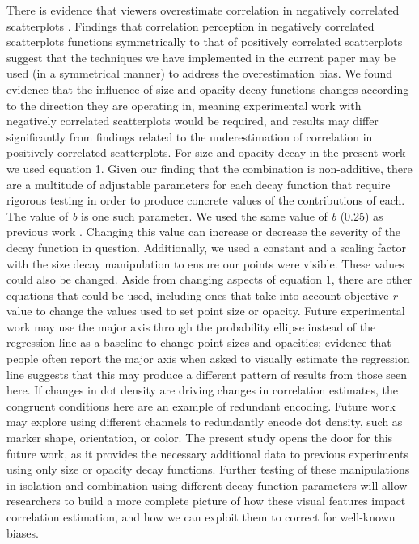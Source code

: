 \documentclass[sigconf]{acmart}
\begin{document}
There is evidence that viewers overestimate correlation in negatively
correlated scatterplots \citep{sher_2017}. Findings that correlation
perception in negatively correlated scatterplots functions symmetrically
to that of positively correlated scatterplots \citep{harrison_2014}
suggest that the techniques we have implemented in the current paper may
be used (in a symmetrical manner) to address the overestimation bias. We
found evidence that the influence of size and opacity decay functions
changes according to the direction they are operating in, meaning
experimental work with negatively correlated scatterplots would be
required, and results may differ significantly from findings related to
the underestimation of correlation in positively correlated
scatterplots. For size and opacity decay in the present work we used
equation 1. Given our finding that the combination is non-additive,
there are a multitude of adjustable parameters for each decay function
that require rigorous testing in order to produce concrete values of the
contributions of each. The value of \emph{b} is one such parameter. We
used the same value of \emph{b} (0.25) as previous work
\citep{strain_2023, strain_2023b}. Changing this value can increase or
decrease the severity of the decay function in question. Additionally,
we used a constant and a scaling factor with the size decay manipulation
to ensure our points were visible. These values could also be changed.
Aside from changing aspects of equation 1, there are other equations
that could be used, including ones that take into account objective
\emph{r} value to change the values used to set point size or opacity.
Future experimental work may use the major axis through the probability
ellipse instead of the regression line as a baseline to change point
sizes and opacities; evidence that people often report the major axis
when asked to visually estimate the regression line \citep{collyer_1990}
suggests that this may produce a different pattern of results from those
seen here. If changes in dot density are driving changes in correlation
estimates, the congruent conditions here are an example of redundant
encoding. Future work may explore using different channels to
redundantly encode dot density, such as marker shape, orientation, or
color. The present study opens the door for this future work, as it
provides the necessary additional data to previous experiments using
only size \citep{strain_2023b} or opacity \citep{strain_2023} decay
functions. Further testing of these manipulations in isolation and
combination using different decay function parameters will allow
researchers to build a more complete picture of how these visual
features impact correlation estimation, and how we can exploit them to
correct for well-known biases.
\end{document}
